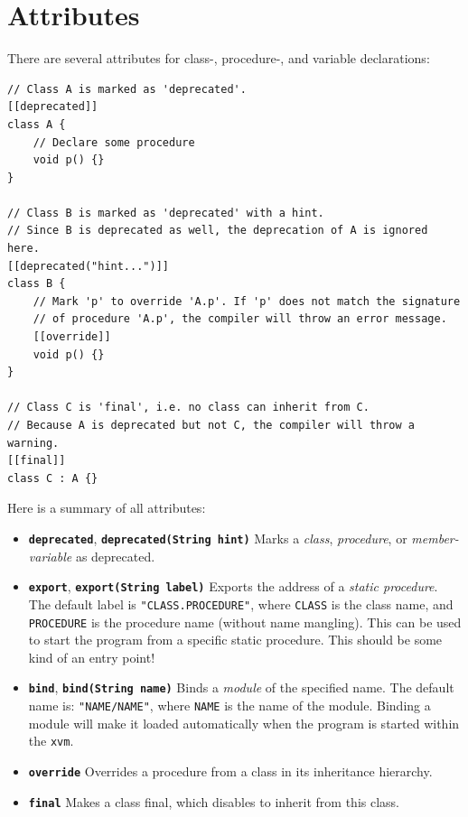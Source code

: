 \documentclass[a5paper]{report}
\def\xvm{\texttt{xvm}\xspace}
\begin{document}
\section{Attributes}

There are several attributes for class-, procedure-, and variable declarations:
\begin{lstlisting}
// Class A is marked as 'deprecated'.
[[deprecated]]
class A {
    // Declare some procedure
    void p() {}
}

// Class B is marked as 'deprecated' with a hint.
// Since B is deprecated as well, the deprecation of A is ignored here.
[[deprecated("hint...")]]
class B {
    // Mark 'p' to override 'A.p'. If 'p' does not match the signature
    // of procedure 'A.p', the compiler will throw an error message.
    [[override]]
    void p() {}
}

// Class C is 'final', i.e. no class can inherit from C.
// Because A is deprecated but not C, the compiler will throw a warning.
[[final]]
class C : A {}
\end{lstlisting}
Here is a summary of all attributes:
\begin{itemize}
	\item \textbf{\texttt{deprecated}}, \textbf{\texttt{deprecated(String hint)}}
		Marks a \textit{class}, \textit{procedure}, or \textit{member-variable} as deprecated.
	\item \textbf{\texttt{export}}, \textbf{\texttt{export(String label)}}
		Exports the address of a \textit{static procedure}. The default label is \texttt{"CLASS.PROCEDURE"},
		where \texttt{CLASS} is the class name, and \texttt{PROCEDURE} is the procedure name (without name mangling).
		This can be used to start the program from a specific static procedure. This should be some kind of an entry point!
	\item \textbf{\texttt{bind}}, \textbf{\texttt{bind(String name)}}
		Binds a \textit{module} of the specified name. The default name is: \texttt{"NAME/NAME"},
		where \texttt{NAME} is the name of the module. Binding a module will make it loaded automatically when the
		program is started within the \xvm.
	\item \textbf{\texttt{override}} Overrides a procedure from a class in its inheritance hierarchy.
	\item \textbf{\texttt{final}} Makes a class final, which disables to inherit from this class.
\end{itemize}


\end{document}
